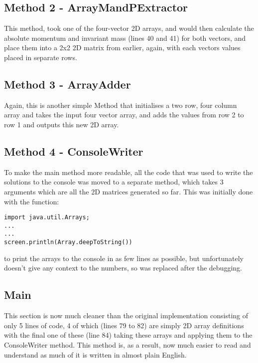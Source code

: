 \documentclass{article}
\begin{document}
\begin{multicols}{2}
			\subsection{Method 2 - ArrayMandPExtractor}
			This method, took one of the four-vector 2D arrays, and would then calculate the absolute momentum and invariant mass (lines 40 and 41) for both vectors, and place them into a 2x2 2D matrix from earlier, again, with each vectors values placed in separate rows.
			\subsection{Method 3 - ArrayAdder}
			Again, this is another simple Method that initialises a two row, four column array and takes the input four vector array, and adds the values from row 2 to row 1 and outputs this new 2D array.
			\subsection{Method 4 - ConsoleWriter}
			To make the main method more readable, all the code that was used to write the solutions to the console was moved to a separate method, which takes 3 arguments which are all the 2D matrices generated so far. This was initially done with the function:
			\begin{lstlisting}
import java.util.Arrays;
...
...
screen.println(Array.deepToString())
			\end{lstlisting}
			to print the arrays to the console in as few lines as possible, but unfortunately doesn't give any context to the numbers, so was replaced after the debugging.
			\subsection{Main}
			This section is now much cleaner than the original implementation consisting of only 5 lines of code, 4 of which (lines 79 to 82) are simply 2D array definitions with the final one of these (line 84) taking these arrays and applying them to the ConsoleWriter method. This method is, as a result, now much easier to read and understand as much of it is written in almost plain English.

\end{multicols}
\end{document}
